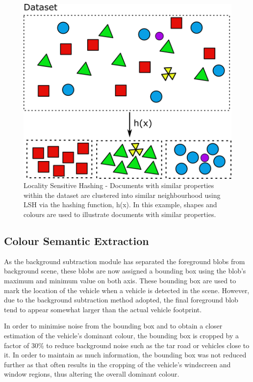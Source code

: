 \begin{figure}[hbt!]\centering
\includegraphics[width=.7\textwidth]{image/new/lsh.png}
\caption{Locality Sensitive Hashing - Documents with similar properties within the dataset are clustered into similar neighbourhood using LSH via the hashing function, h(x). In this example, shapes and colours are used to illustrate documents with similar properties.}
\label{fig:lshexample}
\end{figure}



\subsection{Colour Semantic Extraction }
\label{section:versionOneColorExtract}

As the background subtraction module has separated the foreground blobs from background scene, these blobs are now assigned a bounding box using the blob's maximum and minimum value on both axis. These bounding box are used to mark the location of the vehicle when a vehicle is detected in the scene. However, due to the background subtraction method adopted, the final foreground blob tend to appear somewhat larger than the actual vehicle footprint.

In order to minimise noise from the bounding box and to obtain a closer estimation of the vehicle's dominant colour, the bounding box is cropped by a factor of 30\% to reduce background noise such as the tar road or vehicles close to it. In order to maintain as much information, the bounding box was not reduced further as that often results in the cropping of the vehicle's windscreen and window regions, thus altering the overall dominant colour.

